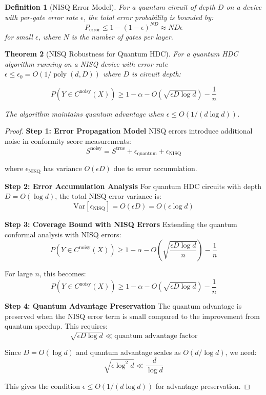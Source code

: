 \documentclass[11pt]{article}
\newtheorem{theorem}{Theorem}[section]
\newtheorem{definition}[theorem]{Definition}
\DeclareMathOperator{\poly}{poly}
\begin{document}
\begin{definition}[NISQ Error Model]
For a quantum circuit of depth $D$ on a device with per-gate error rate $\epsilon$, the total error probability is bounded by:
$$P_{\text{error}} \leq 1 - (1-\epsilon)^{ND} \approx ND\epsilon$$
for small $\epsilon$, where $N$ is the number of gates per layer.
\end{definition}

\begin{theorem}[NISQ Robustness for Quantum HDC]
\label{thm:nisq_robustness}
For a quantum HDC algorithm running on a NISQ device with error rate $\epsilon \leq \epsilon_0 = O(1/\poly(d, D))$ where $D$ is circuit depth:

$$P(Y \in C^{\text{noisy}}(X)) \geq 1 - \alpha - O\left(\sqrt{\epsilon D \log d}\right) - \frac{1}{n}$$

The algorithm maintains quantum advantage when $\epsilon \leq O(1/(d \log d))$.
\end{theorem}

\begin{proof}
\textbf{Step 1: Error Propagation Model}
NISQ errors introduce additional noise in conformity score measurements:
$$S^{\text{noisy}} = S^{\text{true}} + \epsilon_{\text{quantum}} + \epsilon_{\text{NISQ}}$$

where $\epsilon_{\text{NISQ}}$ has variance $O(\epsilon D)$ due to error accumulation.

\textbf{Step 2: Error Accumulation Analysis}
For quantum HDC circuits with depth $D = O(\log d)$, the total NISQ error variance is:
$$\text{Var}[\epsilon_{\text{NISQ}}] = O(\epsilon D) = O(\epsilon \log d)$$

\textbf{Step 3: Coverage Bound with NISQ Errors}
Extending the quantum conformal analysis with NISQ errors:
$$P(Y \in C^{\text{noisy}}(X)) \geq 1 - \alpha - O\left(\sqrt{\frac{\epsilon D \log d}{n}}\right) - \frac{1}{n}$$

For large $n$, this becomes:
$$P(Y \in C^{\text{noisy}}(X)) \geq 1 - \alpha - O\left(\sqrt{\epsilon D \log d}\right) - \frac{1}{n}$$

\textbf{Step 4: Quantum Advantage Preservation}
The quantum advantage is preserved when the NISQ error term is small compared to the improvement from quantum speedup. This requires:
$$\sqrt{\epsilon D \log d} \ll \text{quantum advantage factor}$$

Since $D = O(\log d)$ and quantum advantage scales as $O(d/\log d)$, we need:
$$\sqrt{\epsilon \log^2 d} \ll \frac{d}{\log d}$$

This gives the condition $\epsilon \leq O(1/(d \log d))$ for advantage preservation.
\end{proof}
\end{document}
